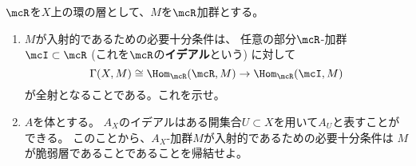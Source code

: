 \documentclass[uplatex,dvipdfmx]{jsarticle}
\begin{document}
\maketitle
\HeaderCommentA
\section{}
\fi

\begin{prob}\label{2.10}
  \(\mcR\)を\(X\)上の環の層として、\(M\)を\(\mcR\)加群とする。
  \begin{enumerate}
    \item \label{2.10.1}
    \(M\)が入射的であるための必要十分条件は、
    任意の部分\(\mcR\)-加群\(\mcI\subset \mcR\)
    (これを\(\mcR\)の\textbf{イデアル}という)
    に対して
    \[
    \Gamma(X,M) \cong \Hom_{\mcR}(\mcR,M)\to \Hom_{\mcR}(\mcI,M)
    \]
    が全射となることである。これを示せ。
    \item \label{2.10.2}
    \(A\)を体とする。
    \(A_X\)のイデアルはある開集合\(U\subset X\)を用いて\(A_U\)と表すことができる。
    このことから、\(A_X\)-加群\(M\)が入射的であるための必要十分条件は
    \(M\)が脆弱層であることであることを帰結せよ。
  \end{enumerate}
\end{prob}
\end{document}

